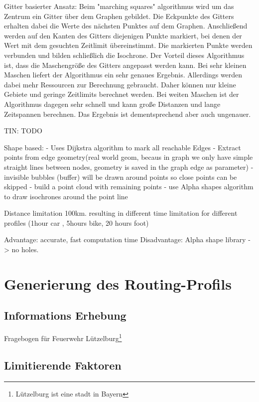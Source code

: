 \documentclass[10pt,a4paper]{article}
\begin{document}
Gitter basierter Ansatz:
Beim "marching squares" algorithmus wird um das Zentrum ein Gitter über dem Graphen gebildet. Die Eckpunkte des Gitters erhalten dabei die Werte des nächsten Punktes auf dem Graphen. Anschließend werden auf den Kanten des Gitters diejenigen Punkte markiert, bei denen der Wert mit dem gesuchten Zeitlimit übereinstimmt. Die markierten Punkte werden verbunden und bilden schließlich die Isochrone.
Der Vorteil dieses Algorithmus ist, dass die Maschengröße des Gitters angepasst werden kann. Bei sehr kleinen Maschen liefert der Algorithmus ein sehr genaues Ergebnis. Allerdings werden dabei mehr Ressourcen zur Berechnung gebraucht. Daher können nur kleine Gebiete und geringe Zeitlimits berechnet werden. Bei weiten Maschen ist der Algorithmus dagegen sehr schnell und kann große Distanzen und lange Zeitspannen berechnen. Das Ergebnis ist dementsprechend aber auch ungenauer.

TIN:
TODO

Shape based:
- Uses Dijkstra algorithm to mark all reachable Edges
- Extract points from edge geometry(real world geom, becaus in graph we only have simple straight lines between nodes, geometry is saved in the graph edge as parameter)
- invisible bubbles (buffer) will be drawn around points so close points can be skipped
- build a point cloud with remaining points
- use Alpha shapes algorithm to draw isochrones around the point line

 Distance limitation 100km. resulting in different time limitation for different profiles (1hour car , 5hours bike, 20 hours foot)

Advantage: accurate, fast computation time
Disadvantage: Alpha shape library -> no holes.



\section{Generierung des Routing-Profils}

\subsection{Informations Erhebung}
Fragebogen für Feuerwehr Lützelburg\footnote{Lützelburg ist eine stadt in Bayern}

\subsection{Limitierende Faktoren}
\end{document}
